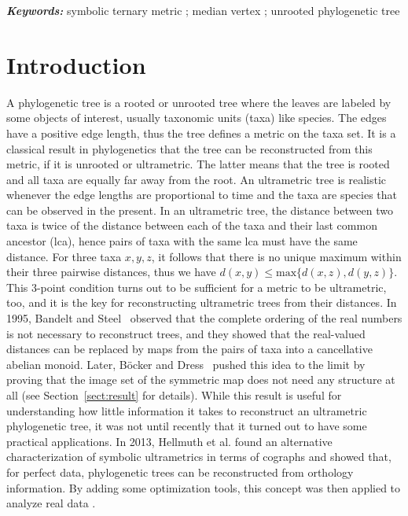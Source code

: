 \documentclass{article}
\providecommand{\keywords}[1]{\textbf{\textit{Keywords: }} #1}
\newcommand{\TODO}[1]{\begingroup\color{red}#1\endgroup}
\begin{document}
\smallskip
\noindent


\keywords{symbolic ternary metric ; median vertex ; unrooted phylogenetic tree }

\sloppy

\section{Introduction}

A phylogenetic tree is a rooted or unrooted tree where the leaves are labeled 
by 
some objects of interest, usually taxonomic units (taxa) like species. The 
edges 
have a positive edge length, thus the tree defines a metric on the taxa set. It 
is a classical result in phylogenetics that the tree can be reconstructed from 
this metric, if it is unrooted or ultrametric. The latter means that the tree 
is 
rooted and all taxa are equally far away from the root. An ultrametric tree is 
realistic whenever the edge lengths are proportional to time and the taxa are species 
that can be observed in the present. In an ultrametric tree, the distance 
between two taxa is twice of the distance between each of the taxa and their last 
common ancestor (lca), hence pairs of taxa with the same lca must have the same 
distance. For three taxa $x,y,z$, it follows that there is no unique maximum 
within their three pairwise distances, thus we have $d(x,y) \le 
\mbox{max}\{d(x,z),d(y,z)\}$. This 3-point condition turns out to be sufficient 
for a metric to be ultrametric, too, and it is the key for reconstructing 
ultrametric trees from their distances. In  1995, Bandelt and 
Steel~\cite{Bandelt1995} observed that 
the complete ordering of the real numbers is not necessary to reconstruct 
trees, 
and they showed that the real-valued distances can be replaced by maps from the 
pairs of taxa into a cancellative abelian monoid. Later, B\" ocker and 
Dress~\cite{Bocker1998} 
pushed this idea to the limit by proving that the image set of the symmetric 
map does not need any structure at all (see Section~\ref{sect:result} for details). 
While this result is useful for understanding how little information it 
takes to reconstruct an ultrametric phylogenetic tree, it was not until recently that 
it turned out to have some practical applications. In 2013, Hellmuth et al. 
\cite{Hellmuth2013} found an alternative characterization of symbolic ultrametrics 
in terms of cographs and showed that, for perfect data, phylogenetic trees can be 
reconstructed from orthology information. By adding some optimization tools, 
this concept was then applied to analyze real data \cite{Hellmuth2015}. 
\end{document}
